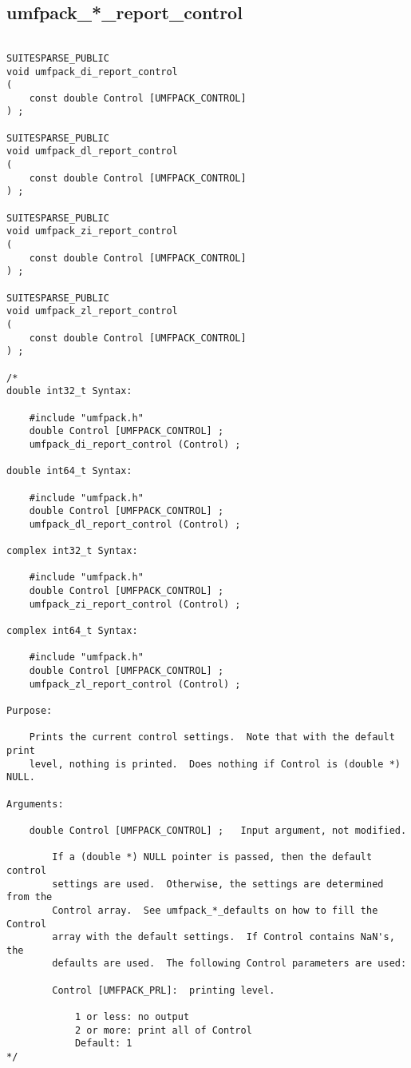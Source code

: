 \documentclass[11pt]{article}
\begin{document}
\newpage
\subsection{umfpack\_*\_report\_control}

{\footnotesize
\begin{verbatim}

SUITESPARSE_PUBLIC
void umfpack_di_report_control
(
    const double Control [UMFPACK_CONTROL]
) ;

SUITESPARSE_PUBLIC
void umfpack_dl_report_control
(
    const double Control [UMFPACK_CONTROL]
) ;

SUITESPARSE_PUBLIC
void umfpack_zi_report_control
(
    const double Control [UMFPACK_CONTROL]
) ;

SUITESPARSE_PUBLIC
void umfpack_zl_report_control
(
    const double Control [UMFPACK_CONTROL]
) ;

/*
double int32_t Syntax:

    #include "umfpack.h"
    double Control [UMFPACK_CONTROL] ;
    umfpack_di_report_control (Control) ;

double int64_t Syntax:

    #include "umfpack.h"
    double Control [UMFPACK_CONTROL] ;
    umfpack_dl_report_control (Control) ;

complex int32_t Syntax:

    #include "umfpack.h"
    double Control [UMFPACK_CONTROL] ;
    umfpack_zi_report_control (Control) ;

complex int64_t Syntax:

    #include "umfpack.h"
    double Control [UMFPACK_CONTROL] ;
    umfpack_zl_report_control (Control) ;

Purpose:

    Prints the current control settings.  Note that with the default print
    level, nothing is printed.  Does nothing if Control is (double *) NULL.

Arguments:

    double Control [UMFPACK_CONTROL] ;   Input argument, not modified.

        If a (double *) NULL pointer is passed, then the default control
        settings are used.  Otherwise, the settings are determined from the
        Control array.  See umfpack_*_defaults on how to fill the Control
        array with the default settings.  If Control contains NaN's, the
        defaults are used.  The following Control parameters are used:

        Control [UMFPACK_PRL]:  printing level.

            1 or less: no output
            2 or more: print all of Control
            Default: 1
*/
\end{verbatim}
}
\end{document}

